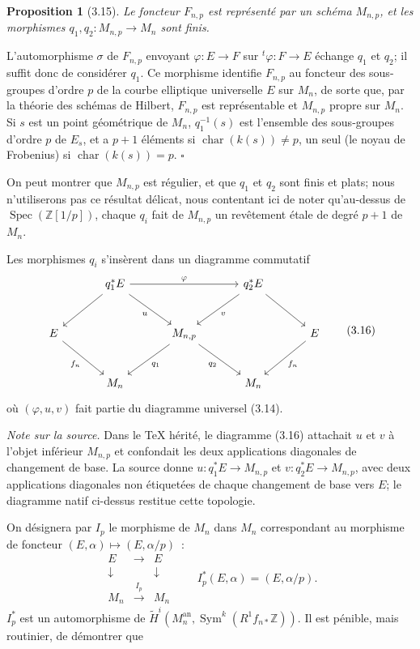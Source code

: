 \documentclass[10pt]{article}
\newcommand{\Z}{\mathbb Z}
\newcommand{\Sym}{\operatorname{Sym}}
\newcommand{\Spec}{\operatorname{Spec}}
\newcommand{\an}{\mathrm{an}}
\newcommand{\QED}{\hfill$\square$}
\newcommand{\charop}{\operatorname{char}}
\newtheorem*{proposition}{Proposition}
\begin{document}
\begin{proposition}[3.15]
Le foncteur $F_{n,p}$ est représenté par un schéma $M_{n,p}$, et les morphismes $q_1,q_2:M_{n,p}\to M_n$ sont finis.
\end{proposition}

L'automorphisme $\sigma$ de $F_{n,p}$ envoyant $\varphi:E\to F$ sur
${}^{t}\!\varphi:F\to E$ échange $q_1$ et $q_2$; il suffit donc de considérer $q_1$.
Ce morphisme identifie $F_{n,p}$ au foncteur des sous-groupes d'ordre $p$ de la courbe
elliptique universelle $E$ sur $M_n$, de sorte que, par la théorie des schémas de Hilbert,
$F_{n,p}$ est représentable et $M_{n,p}$ propre sur $M_n$. Si $s$ est un point géométrique
de $M_n$, $q_1^{-1}(s)$ est l'ensemble des sous-groupes d'ordre $p$ de $E_s$, et a $p+1$
éléments si $\charop(k(s))\ne p$, un seul (le noyau de Frobenius) si $\charop(k(s))=p$. \QED

On peut montrer que $M_{n,p}$ est régulier, et que $q_1$ et $q_2$ sont finis et plats;
nous n'utiliserons pas ce résultat délicat, nous contentant ici de noter qu'au-dessus de
$\Spec(\Z[1/p])$, chaque $q_i$ fait de $M_{n,p}$ un revêtement étale de degré $p+1$ de $M_n$.

Les morphismes $q_i$ s'insèrent dans un diagramme commutatif
\begin{equation}
\begin{tikzcd}[column sep=3.3em,row sep=2.7em]
& q_1^*E \arrow[rr,"\varphi"] \arrow[dl] \arrow[dr,"u"'] &&
q_2^*E \arrow[dl,"v"] \arrow[dr] & \\
E \arrow[dr,"f_n"'] && M_{n,p} \arrow[dl,"q_1"] \arrow[dr,"q_2"'] &&
E \arrow[dl,"f_n"] \\
& M_n && M_n &
\end{tikzcd}
\tag{3.16}
\end{equation}
où $(\varphi,u,v)$ fait partie du diagramme universel (3.14).

\noindent\emph{Note sur la source.} Dans le TeX hérité, le diagramme (3.16) attachait $u$ et $v$ à l'objet inférieur $M_{n,p}$ et confondait les deux applications diagonales de changement de base. La source donne $u:q_1^*E\to M_{n,p}$ et $v:q_2^*E\to M_{n,p}$, avec deux applications diagonales non étiquetées de chaque changement de base vers $E$; le diagramme natif ci-dessus restitue cette topologie.

On désignera par $I_p$ le morphisme de $M_n$ dans $M_n$ correspondant au morphisme
de foncteur $(E,\alpha)\mapsto(E,\alpha/p)$~:
\[
\begin{array}{ccc}
E&\longrightarrow&E\\
\downarrow&&\downarrow\\
M_n&\xrightarrow{\ I_p\ }&M_n
\end{array}
\qquad
I_p^*(E,\alpha)=(E,\alpha/p).
\tag{3.17}
\]
$I_p^*$ est un automorphisme de $\widetilde H^i(M_n^{\an},\Sym^k(R^1f_{n*}\Z))$.
Il est pénible, mais routinier, de démontrer que
\end{document}

